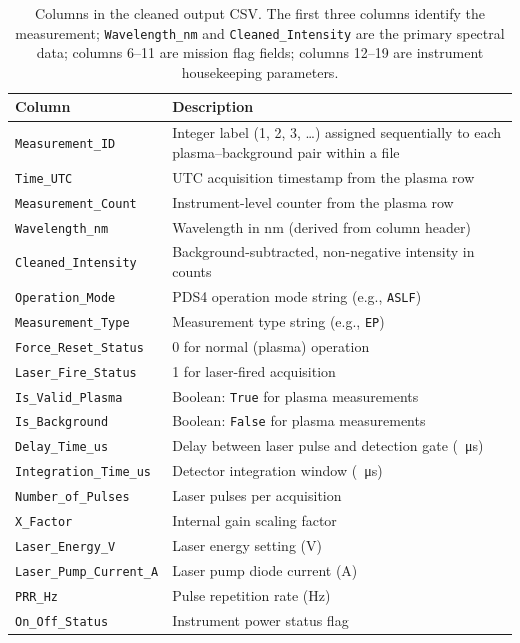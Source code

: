 \documentclass[a4paper,twocolumn,10pt]{article}
\begin{document}
\begin{table}[htbp]
\centering
\caption{Columns in the cleaned output CSV.  The first three columns
  identify the measurement; \texttt{Wavelength\_nm} and
  \texttt{Cleaned\_Intensity} are the primary spectral data; columns
  6--11 are mission flag fields; columns 12--19 are instrument
  housekeeping parameters.}
\label{tab:cleaned_schema}
\begin{tabularx}{\columnwidth}{lX}
\toprule
\textbf{Column} & \textbf{Description} \\
\midrule
\texttt{Measurement\_ID} & Integer label (1, 2, 3, \ldots) assigned
  sequentially to each plasma--background pair within a file \\
\texttt{Time\_UTC} & UTC acquisition timestamp from the plasma row \\
\texttt{Measurement\_Count} & Instrument-level counter from the plasma
  row \\
\texttt{Wavelength\_nm} & Wavelength in nm (derived from column header) \\
\texttt{Cleaned\_Intensity} & Background-subtracted, non-negative
  intensity in counts \\
\texttt{Operation\_Mode} & PDS4 operation mode string (e.g.,
  \texttt{ASLF}) \\
\texttt{Measurement\_Type} & Measurement type string (e.g.,
  \texttt{EP}) \\
\texttt{Force\_Reset\_Status} & 0 for normal (plasma) operation \\
\texttt{Laser\_Fire\_Status} & 1 for laser-fired acquisition \\
\texttt{Is\_Valid\_Plasma} & Boolean: \texttt{True} for plasma
  measurements \\
\texttt{Is\_Background} & Boolean: \texttt{False} for plasma
  measurements \\
\texttt{Delay\_Time\_us} & Delay between laser pulse and detection
  gate (\SI{}{\micro\second}) \\
\texttt{Integration\_Time\_us} & Detector integration window
  (\SI{}{\micro\second}) \\
\texttt{Number\_of\_Pulses} & Laser pulses per acquisition \\
\texttt{X\_Factor} & Internal gain scaling factor \\
\texttt{Laser\_Energy\_V} & Laser energy setting (V) \\
\texttt{Laser\_Pump\_Current\_A} & Laser pump diode current (A) \\
\texttt{PRR\_Hz} & Pulse repetition rate (Hz) \\
\texttt{On\_Off\_Status} & Instrument power status flag \\
\bottomrule
\end{tabularx}
\end{table}
\end{document}
